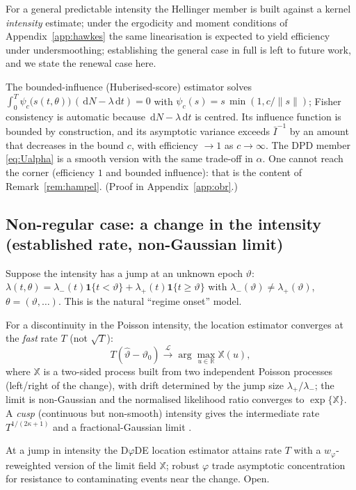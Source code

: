 \documentclass[smallextended,natbib]{svjour3}
\newcommand{\dd}{\,\mathrm{d}}
\newcommand{\R}{\mathbb{R}}
\newcommand{\toL}{\xrightarrow{\mathcal{L}}}
\begin{document}
\begin{remark}\label{rem:hellgen}
For a general predictable intensity the Hellinger member is built against a kernel
\emph{intensity} estimate; under the ergodicity and moment conditions of
Appendix~\ref{app:hawkes} the same linearisation is expected to yield efficiency under
undersmoothing; establishing the general case in full is left to future work, and we
state the renewal case here.
\end{remark}
\begin{proposition}
\label{prop:obr}
The bounded-influence (Huberised-score) estimator solves
$\int_0^T \psi_c\big(s(t,\theta)\big)\,(\dd N-\lambda\dd t)=0$ with
$\psi_c(s)=s\,\min(1,c/\|s\|)$; Fisher consistency is automatic because
$\dd N-\lambda\dd t$ is centred. Its influence function is bounded by construction,
and its asymptotic variance exceeds $\bar I^{-1}$ by an amount that decreases in the
bound $c$, with efficiency $\to1$ as $c\to\infty$. The DPD member \eqref{eq:Ualpha}
is a smooth version with the same trade-off in $\alpha$. One cannot reach the
corner (efficiency $1$ and bounded influence): that is the content of
Remark~\ref{rem:hampel}. (Proof in Appendix~\ref{app:obr}.)
\end{proposition}

\subsection{Non-regular case: a change in the intensity (established rate, non-Gaussian limit)}
Suppose the intensity has a jump at an unknown epoch $\vartheta$:
$\lambda(t,\theta)=\lambda_-(t)\mathbf{1}\{t<\vartheta\}+\lambda_+(t)\mathbf 1\{t\ge\vartheta\}$
with $\lambda_-(\vartheta)\neq\lambda_+(\vartheta)$, $\theta=(\vartheta,\dots)$.
This is the natural ``regime onset'' model.
\begin{theorem}\label{thm:change}
For a discontinuity in the Poisson intensity, the location estimator converges at
the \emph{fast} rate $T$ (not $\sqrt T$):
\[
T(\hat\vartheta-\vartheta_0)\toL \arg\max_{u\in\R} \mathbb{X}(u),
\]
where $\mathbb X$ is a two-sided process built from two independent Poisson
processes (left/right of the change), with drift determined by the jump size
$\lambda_+/\lambda_-$; the limit is non-Gaussian and the normalised likelihood
ratio converges to $\exp\{\mathbb X\}$. \citep{kutoyants1998,ih1981,dachian2003}
A \emph{cusp} (continuous but non-smooth) intensity gives the intermediate rate
$T^{1/(2\kappa+1)}$ and a fractional-Gaussian limit \citep{dachian2003}.
\end{theorem}
\begin{conjecture}\label{conj:change}
At a jump in intensity the D$\varphi$DE location estimator attains rate $T$ with a
$w_\varphi$-reweighted version of the limit field $\mathbb X$; robust $\varphi$
trade asymptotic concentration for resistance to contaminating events near the
change. Open.
\end{conjecture}
\end{document}
